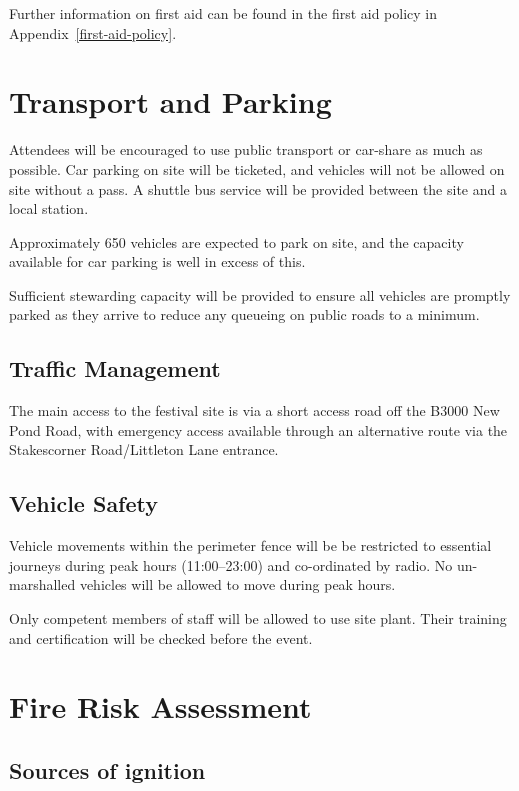 Further information on first aid can be found in the first aid policy in Appendix~\ref{first-aid-policy}.

\section{Transport and Parking}

Attendees will be encouraged to use public transport or car-share as much as possible. Car parking on site will be ticketed,
and vehicles will not be allowed on site without a pass. A shuttle bus service will be provided between the site and a local station.

Approximately 650 vehicles are expected to park on site, and the capacity available for car parking is well in excess of this.

Sufficient stewarding capacity will be provided to ensure all vehicles are promptly parked as they arrive to reduce any queueing
on public roads to a minimum.

\subsection{Traffic Management}

The main access to the festival site is via a short access road off the B3000 New Pond Road, with emergency access available
through an alternative route via the Stakescorner Road/Littleton Lane entrance.

\subsection{Vehicle Safety}

Vehicle movements within the perimeter fence will be be restricted to essential journeys during peak hours (11:00--23:00) and co-ordinated by radio. No un-marshalled vehicles will be allowed to move during peak hours.

Only competent members of staff will be allowed to use site plant. Their training and certification will be checked before the event.

\section{Fire Risk Assessment}
\label{fire}
\subsection{Sources of ignition}

